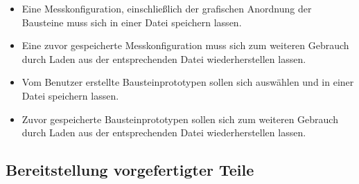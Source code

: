 \documentclass[parskip=full]{scrartcl}
\begin{document}
\begin{itemize}
		
	\item 
	\begin{MussKrit} 			
		Eine Messkonfiguration, einschließlich der grafischen Anordnung der Bausteine muss sich in einer Datei speichern lassen.
	\end{MussKrit}
	
	\item 
	\begin{MussKrit} 			
		Eine zuvor gespeicherte Messkonfiguration muss sich zum weiteren Gebrauch durch Laden aus der entsprechenden Datei wiederherstellen lassen. 
	\end{MussKrit}
	
	\item 
	\begin{SollKrit} 
		Vom Benutzer erstellte Bausteinprototypen sollen sich auswählen und in einer Datei speichern lassen.			
	\end{SollKrit}
	
	\item 
	\begin{SollKrit} 			
		Zuvor gespeicherte Bausteinprototypen sollen sich zum weiteren Gebrauch durch Laden aus der entsprechenden Datei wiederherstellen lassen. 
	\end{SollKrit}
	
\end{itemize}

\subsection {Bereitstellung vorgefertigter Teile}
\end{document}
